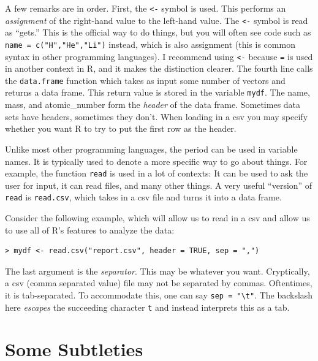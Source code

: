 \documentclass[12pt]{article}
\begin{document}
A few remarks are in order. First, the \verb|<-| symbol is used. This performs an \emph{assignment} of the right-hand value to the left-hand value. The \verb|<-| symbol is read as ``gets.'' This is the official way to do things, but you will often see code such as \verb|name = c("H","He","Li")| instead, which is also assignment (this is common syntax in other programming languages). I recommend using \verb|<-| because \verb|=| is used in another context in R, and it makes the distinction clearer. The fourth line calls the \verb|data.frame| function which takes as input some number of vectors and returns a data frame. This return value is stored in the variable \verb|mydf|.  The name, mass, and atomic\_number form the \emph{header} of the data frame. Sometimes data sets have headers, sometimes they don't. When loading in a csv you may specify whether you want R to try to put the first row as the header.

Unlike most other programming languages, the period can be used in variable names. It is typically used to denote a more specific way to go about things. For example, the function \verb|read| is used in a lot of contexts: It can be used to ask the user for input, it can read files, and many other things. A very useful ``version'' of \verb|read| is \verb|read.csv|, which takes in a csv file and turns it into a data frame.

Consider the following example, which will allow us to read in a csv and allow us to use all of R's features to analyze the data:

\begin{verbatim}
> mydf <- read.csv("report.csv", header = TRUE, sep = ",")
\end{verbatim}

The last argument is the \emph{separator}. This may be whatever you want. Cryptically, a csv (comma separated value) file may not be separated by commas. Oftentimes, it is tab-separated. To accommodate this, one can say \verb|sep = "\t"|. The backslash here \emph{escapes} the succeeding character \verb|t| and instead interprets this as a tab.

\section{Some Subtleties}
\end{document}
